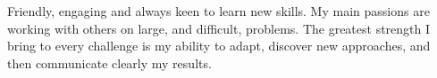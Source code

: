 

\begin{cvparagraph}

Friendly, engaging and always keen to learn new skills. My main passions are working with others on large, and difficult, problems. The greatest strength I bring to every challenge is my ability to adapt, discover new approaches, and then communicate clearly my results.


\end{cvparagraph}